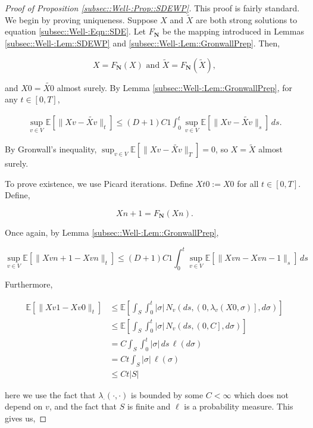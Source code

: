 \documentclass[12pt]{article}
\newcommand{\skipLine}{\vspace{12pt}}
\newcommand{\mb}{\mathbb}
\newcommand{\te}{\text}
\newcommand{\ex}[1]{\mb{E}\left[#1\right]}			%
\newcommand{\defeq}{:=}								%
\renewcommand{\v}{v}							%
\renewcommand{\S}{S}							%
\newcommand{\s}{\sigma}							%
\newcommand{\T}{T}								%
\renewcommand{\t}{t}							%
\renewcommand{\tt}{s}							%
\newcommand{\X}{X}								%
\newcommand{\const}{C}							%
\newcommand{\degr}{D}							%
\newcommand{\poiss}[1]{N_{#1}}						%
\newcommand{\poisses}{\mathbf{N}}				%
\newcommand{\rate}[1]{\lambda_{#1}}					%
\newcommand{\Sm}{\ell}								%
\newcommand{\alt}{\widetilde}						%
\begin{document}
\begin{proof}[Proof of Proposition \ref{subsec::Well-:Prop::SDEWP}]

This proof is fairly standard. We begin by proving uniqueness. Suppose \(\X{}{}\) and \(\alt{\X{}{}}\) are both strong solutions to equation \ref{subsec::Well-:Eqn::SDE}. Let \(F_\poisses\) be the mapping introduced in Lemmas \ref{subsec::Well-:Lem::SDEWP} and \ref{subsec::Well-:Lem::GronwallPrep}. Then,

\[\X{}{} = F_\poisses(\X{}{})\te{ and } \alt{\X{}{}} = F_\poisses(\alt{\X{}{}}),\]

and \(\X{}{0} = \alt{\X{}{0}}\) almost surely. By Lemma \ref{subsec::Well-:Lem::GronwallPrep}, for any \(\t\in [0,\T]\),

\begin{align*}
\sup_{\v\in  V}\ex{\|\X{\v}{} - \alt{\X{\v}{}}\|_\t} \leq (\degr+1)\const{1}\int_0^\t\sup_{\v\in  V} \ex{\|\X{\v}{} - \alt{\X{\v}{}}\|_\tt}\,d\tt.
\end{align*}

By Gronwall's inequality, \(\sup_{\v \in  V} \ex{\|\X{\v}{} - \alt{\X{\v}{}}\|_\T} = 0\), so \(\X{}{} = \alt{\X{}{}}\) almost surely.

\skipLine

To prove existence, we use Picard iterations. Define \(\X{}{\t}{0} \defeq \X{}{0}\) for all \(\t \in [0,\T]\). Define,

\[\X{}{}{n+1} = F_\poisses(\X{}{}{n}).\]

Once again, by Lemma \ref{subsec::Well-:Lem::GronwallPrep},

\[\sup_{\v \in  V} \ex{\|\X{\v}{}{n+1} - \X{\v}{}{n}\|_\t} \leq (\degr+1)\const{1} \int_0^\t \sup_{\v \in  V} \ex{\|\X{\v}{}{n} - \X{\v}{}{n-1}\|_\tt}\,d\tt\] 

Furthermore, 

\begin{align*}
\ex{\|\X{\v}{}{1} - \X{\v}{}{0}\|_\t} &\leq \ex{\int_\S\int_0^\t |\s|\,\poiss{\v}\left(d\tt,\left(0,\rate{\v}(\X{}{0},\s)\right],d\s\right)}\\
&\leq \ex{\int_\S\int_0^\t |\s|\,\poiss{\v}\left(d\tt,\left(0,\const{}\right],d\s\right)}\\
&= \const{}\int_\S\int_0^\t |\s|\,d\tt\,\Sm(d\s)\\
&=\const{}\t\int_\S |\s|\,\Sm(\s)\\
&\leq \const{}\t|\S|
\end{align*}

here we use the fact that \(\rate{\cdot}(\cdot,\cdot)\) is bounded by some \(\const{} < \infty\) which does not depend on \(\v\), and the fact that \(\S\) is finite and \(\Sm\) is a probability measure. This gives us,


\end{proof}
\end{document}
